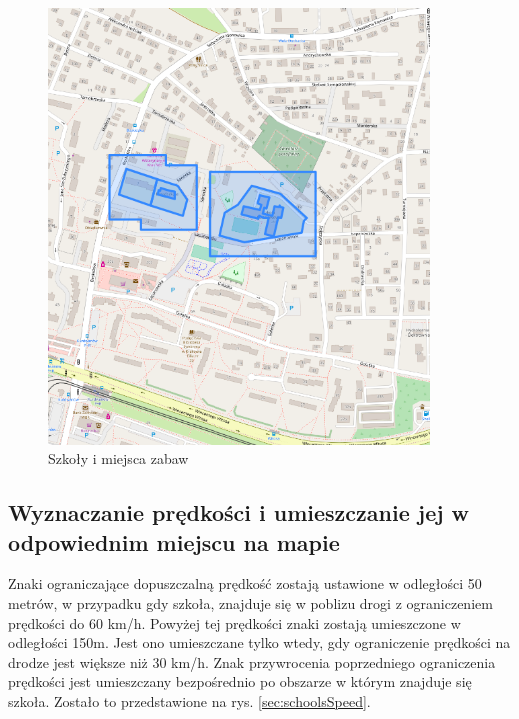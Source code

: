 \begin{figure}[h]
\caption{Szkoły i miejsca zabaw}
\label{sec:schoolBorder}
\centering
\includegraphics[width=0.9\textwidth]{schoolsBorder}
\end{figure}

\newpage
\subsection{Wyznaczanie prędkości i umieszczanie jej w odpowiednim miejscu na mapie}

Znaki ograniczające dopuszczalną prędkość zostają ustawione w odległości 50 metrów, w przypadku gdy szkoła, znajduje się w poblizu drogi z ograniczeniem prędkości do 60 km/h. Powyżej tej prędkości znaki zostają umieszczone w odległości 150m. Jest ono umieszczane tylko wtedy, gdy ograniczenie prędkości na drodze jest większe niż 30 km/h. Znak przywrocenia poprzedniego ograniczenia prędkości jest umieszczany bezpośrednio po obszarze w którym znajduje się szkoła. Zostało to przedstawione na rys. \ref{sec:schoolsSpeed}.

